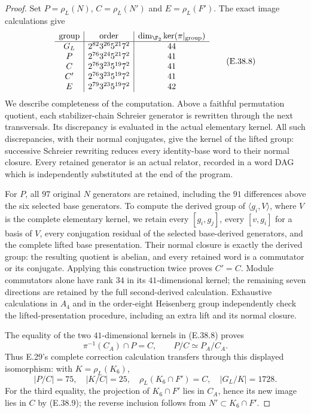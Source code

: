 \begin{proof}
Set $P=\rho_L(N)$, $C=\rho_L(N')$ and
$E=\rho_L(F')$.  The exact image calculations give
\[
 \begin{array}{c|c|c}
 \text{group}&\text{order}&
       \dim_{\F_2}\ker(\pi|_{\text{group}})\\\hline
 G_L&2^{82}3^{26}5^{21}7^2&44\\
 P&2^{76}3^{24}5^{21}7^2&41\\
 C&2^{76}3^{23}5^{19}7^2&41\\
 C'&2^{76}3^{23}5^{19}7^2&41\\
 E&2^{79}3^{23}5^{19}7^2&42
 \end{array}
 \tag{E.38.8}
\]
We describe completeness of the computation.
Above a faithful permutation quotient, each
stabilizer-chain Schreier generator is rewritten
through the next transversals.  Its discrepancy
is evaluated in the actual elementary kernel.
All such discrepancies, with their normal
conjugates, give the kernel of the lifted group:
successive Schreier rewriting reduces every
identity-base word to their normal closure.
Every retained generator is an actual relator,
recorded in a word DAG which is independently
substituted at the end of the program.

For $P$, all $97$ original $N$ generators are
retained, including the $91$ differences above
the six selected base generators.  To compute
the derived group of $\langle g_i,V\rangle$,
where $V$ is the complete elementary kernel,
we retain every $[g_i,g_j]$, every $[v,g_i]$
for a basis of $V$, every conjugation residual
of the selected base-derived generators, and
the complete lifted base presentation.
Their normal closure is exactly the derived
group: the resulting quotient is abelian,
and every retained word is a commutator or
its conjugate.  Applying this construction
twice proves $C'=C$.  Module commutators alone
have rank $34$ in its $41$-dimensional kernel;
the remaining seven directions are retained
by the full second-derived calculation.
Exhaustive calculations in $A_4$ and in the
order-eight Heisenberg group independently
check the lifted-presentation procedure,
including an extra lift and its normal closure.

The equality of the two $41$-dimensional
kernels in \textup{(E.38.8)} proves
\[
 \pi^{-1}(C_A)\cap P=C,
 \qquad P/C\simeq P_A/C_A.
 \tag{E.38.9}
\]
Thus E.29's complete correction calculation
transfers through this displayed isomorphism:
with $K=\rho_L(K_6)$,
\[
 |P/C|=75,\quad |K/C|=25,\quad
 \rho_L(K_6\cap F')=C,\quad |G_L/K|=1728.
 \tag{E.38.10}
\]
For the third equality, the projection of
$K_6\cap F'$ lies in $C_A$, hence its new
image lies in $C$ by \textup{(E.38.9)};
the reverse inclusion follows from
$N'\subset K_6\cap F'$.


\end{proof}
